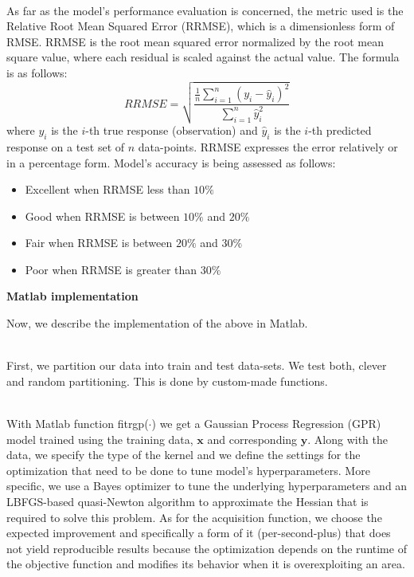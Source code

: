 \documentclass[12pt,a4paper]{article}
\newcommand{\boldmark}[1]{\noindent\textbf{#1}\\ }
\begin{document}
\noindent
\\As far as the model's performance evaluation is concerned, the metric used is the Relative Root Mean Squared Error (RRMSE), which is a dimensionless form of RMSE. RRMSE is the root mean squared error normalized by the root mean square value, where each residual is scaled against the actual value. The formula is as follows:
$$
RRMSE = \sqrt{\frac{\frac{1}{n}\sum_{i=1}^{n}{(y_i - \hat{y}_{i})^{2}}}{\sum_{i=1}^{n}{\hat{y}_{i}^{2}}}}
$$
where $y_i$ is the $i$-th true response (observation) and $\hat{y}_i$ is the $i$-th predicted response on a test set of $n$ data-points. RRMSE expresses the error relatively or in a percentage form. Model's accuracy is being assessed as follows:
\begin{itemize}
    \item Excellent when RRMSE less than $10\%$
    \item Good when RRMSE is between $10\%$ and $20\%$
    \item Fair when RRMSE is between $20\%$ and $30\%$
    \item Poor when RRMSE is greater than $30\%$
\end{itemize}

\newpage

\subsectionmark{}
\noindent
\boldmark{\large{Matlab implementation}}

\normalsize

\noindent
Now, we describe the implementation of the above in Matlab.

\noindent
\\First, we partition our data into train and test data-sets. We test both, clever and random partitioning. This is done by custom-made functions.

\noindent
\\With Matlab function {\color{blue}fitrgp($\cdot$)} we get a Gaussian Process Regression (GPR) model trained using the training data, $\mathbf{x}$ and corresponding $\mathbf{y}$. Along with the data, we specify the type of the kernel and we define the settings for the optimization that need to be done to tune model's hyperparameters. More specific, we use a Bayes optimizer to tune the underlying hyperparameters and an LBFGS-based quasi-Newton algorithm to approximate the Hessian that is required to solve this problem. As for the acquisition function, we choose the expected improvement and specifically a form of it (per-second-plus) that does not yield reproducible results because the optimization depends on the runtime of the objective function and modifies its behavior when it is overexploiting an area.
\end{document}
